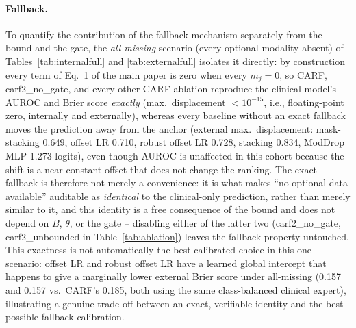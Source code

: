 \documentclass[a4paper,runningheads]{llncs}
\begin{document}
\paragraph{Fallback.} To quantify the contribution of the fallback mechanism separately from the bound and the gate, the \emph{all-missing} scenario (every optional modality absent) of Tables~\ref{tab:internalfull} and \ref{tab:externalfull} isolates it directly: by construction every term of Eq.~1 of the main paper is zero when every $m_j=0$, so CARF, carf2\_no\_gate, and every other CARF ablation reproduce the clinical model's AUROC and Brier score \emph{exactly} (max.\ displacement $<10^{-15}$, i.e., floating-point zero, internally and externally), whereas every baseline without an exact fallback moves the prediction away from the anchor (external max.\ displacement: mask-stacking 0.649, offset LR 0.710, robust offset LR 0.728, stacking 0.834, ModDrop MLP 1.273 logits), even though AUROC is unaffected in this cohort because the shift is a near-constant offset that does not change the ranking. The exact fallback is therefore not merely a convenience: it is what makes ``no optional data available'' auditable as \emph{identical} to the clinical-only prediction, rather than merely similar to it, and this identity is a free consequence of the bound and does not depend on $B$, $\theta$, or the gate -- disabling either of the latter two (carf2\_no\_gate, carf2\_unbounded in Table~\ref{tab:ablation}) leaves the fallback property untouched. This exactness is not automatically the best-calibrated choice in this one scenario: offset LR and robust offset LR have a learned global intercept that happens to give a marginally lower external Brier score under all-missing (0.157 and 0.157 vs.\ CARF's 0.185, both using the same class-balanced clinical expert), illustrating a genuine trade-off between an exact, verifiable identity and the best possible fallback calibration.

\begin{table}[h]
\centering
\caption{Internal AUROC (I-SPY2, mean over 25 folds; swap: 5 realizations per fold) for all scenarios.}
\label{tab:internalfull}
\scriptsize
\setlength{\tabcolsep}{3pt}
\end{table}

\begin{table}[h]
\centering
\caption{External AUROC (I-SPY1) for all output-level scenarios (swap and noisy: mean of 30 realizations; noisy: Gaussian noise of SD 0.25 on the probability; low/high/neutral: output set to 0.01/0.99/0.5) and the largest displacement from the anchor over all scenarios. R: RNA; M: MRI.}
\label{tab:externalfull}
\setlength{\tabcolsep}{2pt}
\end{table}
\end{document}
